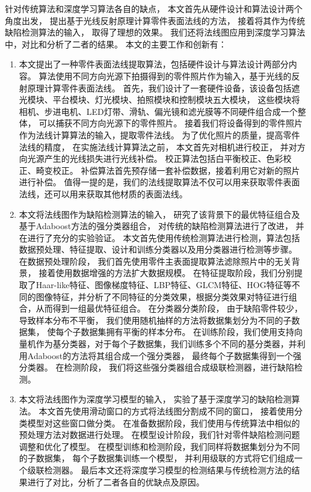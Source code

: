 针对传统算法和深度学习算法各自的缺点，
本文首先从硬件设计和算法设计两个角度出发，
提出基于光线反射原理计算零件表面法线的方法，
接着将其作为传统缺陷检测算法的输入，
取得了理想的效果。
我们还将法线图应用到深度学习算法中，对比和分析了二者的结果。
本文的主要工作和创新有：
\begin{enumerate}

\item 本文提出了一种零件表面法线提取算法，包括硬件设计与算法设计两部分内容。
算法使用不同方向光源下拍摄得到的零件照片作为输入，基于光线的反射原理计算零件表面法线。
首先，我们设计了一套硬件设备，该设备包括遮光模块、平台模块、灯光模块、拍照模块和控制模块五大模块，
这些模块将相机、步进电机、LED灯带、滑轨、偏光镜和滤光膜等不同硬件组合成一个整体，
可以捕获不同方向光源下的零件照片。
接着我们将设备得到的零件照片作为法线计算算法的输入，提取零件法线。
为了优化照片的质量，提高零件法线的精度，
在实施法线计算算法之前，
本文首先对相机进行校正，
并对方向光源产生的光线损失进行光线补偿。
校正算法包括白平衡校正、色彩校正、畸变校正。
补偿算法首先预存储一套补偿数据，接着利用它对新的照片进行补偿。
值得一提的是，我们的法线提取算法不仅可以用来获取零件表面法线，还可以用来获取其他材质的表面法线。

\item 本文将法线图作为缺陷检测算法的输入，
研究了该背景下的最优特征组合及基于Adaboost方法的强分类器组合，
对传统的缺陷检测算法进行了改进，
并在进行了充分的实验验证。
本文首先使用传统检测算法进行检测，算法包括数据预处理、特征提取、设计和训练分类器以及用分类器进行检测等步骤。
在数据预处理阶段，
我们首先使用零件主表面提取算法滤除照片中的无关背景，
接着使用数据增强的方法扩大数据规模。
在特征提取阶段，我们分别提取了Haar-like特征、图像梯度特征、LBP特征、GLCM特征、HOG特征等不同的图像特征，并分析了不同特征的分类效果，根据分类效果对特征进行组合，从而得到一组最优特征组合。
在分类器分类阶段，
由于缺陷零件较少，
导致样本分布不平衡，
我们使用随机抽样的方法将数据集划分为不同的子数据集，
使每个子数据集拥有平衡的样本分布。
在训练阶段，我们使用支持向量机作为基分类器，对于每个子数据集，我们训练多个不同的基分类器，并利用Adaboost的方法将其组合成一个强分类器，
最终每个子数据集得到一个强分类器。
在检测阶段，
我们将这些强分类器组合成级联检测器，进行缺陷检测。

\item 本文将法线图作为深度学习模型的输入，
实验了基于深度学习的缺陷检测算法。
本文首先使用滑动窗口的方式将法线图分割成不同的窗口，
接着使用分类模型对这些窗口做分类。
在准备数据阶段，我们使用与传统算法中相似的预处理方法对数据进行处理。
在模型设计阶段，我们针对零件缺陷检测问题调整和优化了模型。
在模型训练和检测阶段，我们同样将数据集划分为不同的子数据集，
每个子数据集训练一个模型，
并利用级联的方式将它们组成一个级联检测器。
最后本文还将深度学习模型的检测结果与传统检测方法的结果进行了对比，分析了二者各自的优缺点及原因。

\end{enumerate}
